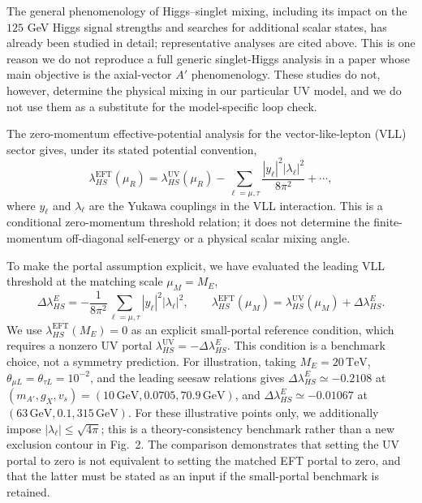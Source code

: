 \documentclass[12pt,a4paper]{article}
\begin{document}
The general phenomenology of Higgs--singlet mixing, including its impact on the \(125\) GeV Higgs signal strengths and searches for additional scalar states, has already been studied in detail; representative analyses are cited above. This is one reason we do not reproduce a full generic singlet-Higgs analysis in a paper whose main objective is the axial-vector \(A'\) phenomenology. These studies do not, however, determine the physical mixing in our particular UV model, and we do not use them as a substitute for the model-specific loop check.

The zero-momentum effective-potential analysis for the vector-like-lepton (VLL) sector gives, under its stated potential convention,
\[
\lambda_{HS}^{\mathrm{EFT}}(\mu_R)
=\lambda_{HS}^{\mathrm{UV}}(\mu_R)
-\sum_{\ell=\mu,\tau}
\frac{|y_\ell|^2|\lambda_\ell|^2}{8\pi^2}
+\cdots,
\]
where \(y_\ell\) and \(\lambda_\ell\) are the Yukawa couplings in the VLL interaction. This is a conditional zero-momentum threshold relation; it does not determine the finite-momentum off-diagonal self-energy or a physical scalar mixing angle.

To make the portal assumption explicit, we have evaluated the leading VLL threshold at the matching scale \(\mu_M=M_E\),
\[
\Delta\lambda_{HS}^{E}
=-\frac{1}{8\pi^2}\sum_{\ell=\mu,\tau}|y_\ell|^2|\lambda_\ell|^2,
\qquad
\lambda_{HS}^{\mathrm{EFT}}(\mu_M)
=\lambda_{HS}^{\mathrm{UV}}(\mu_M)+\Delta\lambda_{HS}^{E}.
\]
We use \(\lambda_{HS}^{\mathrm{EFT}}(M_E)=0\) as an explicit small-portal reference condition, which requires a nonzero UV portal \(\lambda_{HS}^{\mathrm{UV}}=-\Delta\lambda_{HS}^{E}\). This condition is a benchmark choice, not a symmetry prediction. For illustration, taking \(M_E=20\,\mathrm{TeV}\), \(\theta_{\mu L}=\theta_{\tau L}=10^{-2}\), and the leading seesaw relations gives \(\Delta\lambda_{HS}^{E}\simeq-0.2108\) at \((m_{A'},g_X,v_s)=(10\,\mathrm{GeV},0.0705,70.9\,\mathrm{GeV})\), and \(\Delta\lambda_{HS}^{E}\simeq-0.01067\) at \((63\,\mathrm{GeV},0.1,315\,\mathrm{GeV})\). For these illustrative points only, we additionally impose \(|\lambda_\ell|\leq\sqrt{4\pi}\); this is a theory-consistency benchmark rather than a new exclusion contour in Fig.~2. The comparison demonstrates that setting the UV portal to zero is not equivalent to setting the matched EFT portal to zero, and that the latter must be stated as an input if the small-portal benchmark is retained.
\end{document}
